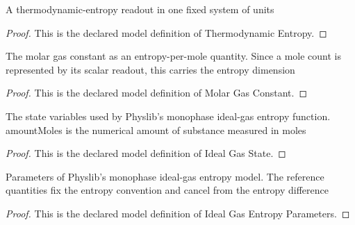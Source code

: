 \begin{definition}
  \label{def:physics:phyx-mini-0475:phyxmini0475-thermodynamicentropy}
  A thermodynamic-entropy readout in one fixed system of units
\end{definition}
\begin{proof}
  This is the declared model definition of Thermodynamic Entropy.
\end{proof}
\begin{definition}
  \label{def:physics:phyx-mini-0475:phyxmini0475-molargasconstant}
  The molar gas constant as an entropy-per-mole quantity. Since a mole count is represented by its scalar readout, this carries the entropy dimension
\end{definition}
\begin{proof}
  This is the declared model definition of Molar Gas Constant.
\end{proof}
\begin{definition}
  \label{def:physics:phyx-mini-0475:phyxmini0475-idealgasstate}
  The state variables used by Physlib's monophase ideal-gas entropy function. amountMoles is the numerical amount of substance measured in moles
\end{definition}
\begin{proof}
  This is the declared model definition of Ideal Gas State.
\end{proof}
\begin{definition}
  \label{def:physics:phyx-mini-0475:phyxmini0475-idealgasentropyparameters}
  Parameters of Physlib's monophase ideal-gas entropy model. The reference quantities fix the entropy convention and cancel from the entropy difference
\end{definition}
\begin{proof}
  This is the declared model definition of Ideal Gas Entropy Parameters.
\end{proof}
